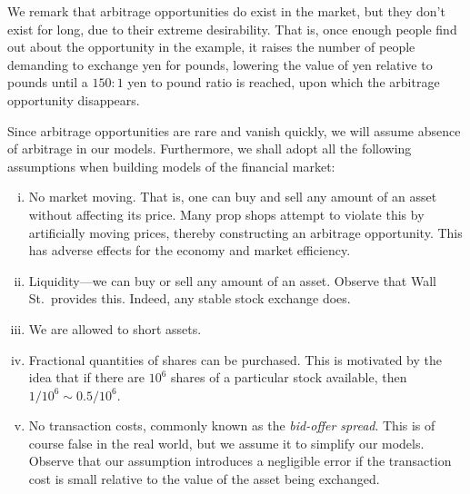 \documentclass[12pt]{article}
\theoremstyle{plain}
\theoremstyle{definition}
\theoremstyle{remark}
\numberwithin{equation}{section}  %
\begin{document}
We remark that arbitrage opportunities do exist in the market, but they don't exist for long, due to their extreme desirability. That is, once enough people find out about the opportunity in the example, it raises the number of people demanding to exchange yen for pounds, lowering the value of yen relative to pounds until a $150:1$ yen to pound ratio is reached, upon which the arbitrage opportunity disappears.  

Since arbitrage opportunities are rare and vanish quickly, we will assume 
absence of arbitrage in our models. Furthermore, we shall adopt all the following
assumptions when building models of the financial market:

\begin{enumerate}[(i)]
    \item No market moving. That is, one can buy and sell any amount of an asset
        without affecting its price. Many prop shops attempt to violate this by artificially moving prices, thereby constructing an arbitrage opportunity. This has adverse effects for the economy and market efficiency.   
    \item Liquidity---we can buy or sell any amount of an asset. Observe that Wall St.\  provides this. Indeed, any stable stock exchange does. 
    \item We are allowed to short assets.
    \item Fractional quantities of shares can be purchased. This is motivated by the idea that if there are $10^{6}$ shares of a particular stock available, then $1/10^6 \sim 0.5/10^{6}$.
    \item No transaction costs, commonly known as the \emph{bid-offer spread}. This is of course false in the real world, but we assume it to simplify our models. Observe that our assumption introduces a negligible error if the transaction cost is small relative to the value of the asset being exchanged.
\end{enumerate}
\end{document}
